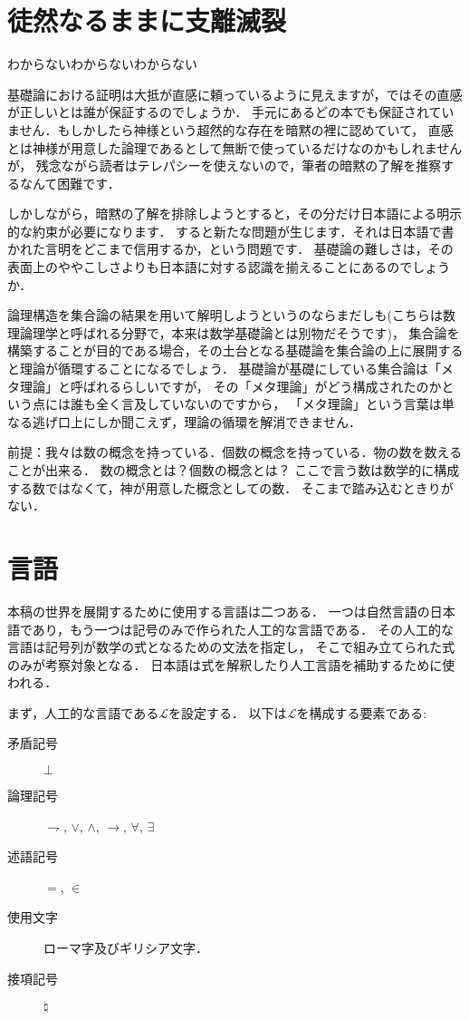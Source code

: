 \documentclass[a4j,10.5pt,oneside,openany]{jsbook}
\theoremstyle{mystyle}
\begin{document}

\section{徒然なるままに支離滅裂}
わからないわからないわからない

基礎論における証明は大抵が直感に頼っているように見えますが，ではその直感が正しいとは誰が保証するのでしょうか．
手元にあるどの本でも保証されていません．もしかしたら神様という超然的な存在を暗黙の裡に認めていて，
直感とは神様が用意した論理であるとして無断で使っているだけなのかもしれませんが，
残念ながら読者はテレパシーを使えないので，筆者の暗黙の了解を推察するなんて困難です．

しかしながら，暗黙の了解を排除しようとすると，その分だけ日本語による明示的な約束が必要になります．
すると新たな問題が生じます．それは日本語で書かれた言明をどこまで信用するか，という問題です．
基礎論の難しさは，その表面上のややこしさよりも日本語に対する認識を揃えることにあるのでしょうか．

論理構造を集合論の結果を用いて解明しようというのならまだしも(こちらは数理論理学と呼ばれる分野で，本来は数学基礎論とは別物だそうです)，
集合論を構築することが目的である場合，その土台となる基礎論を集合論の上に展開すると理論が循環することになるでしょう．
基礎論が基礎にしている集合論は「メタ理論」と呼ばれるらしいですが，
その「メタ理論」がどう構成されたのかという点には誰も全く言及していないのですから，
「メタ理論」という言葉は単なる逃げ口上にしか聞こえず，理論の循環を解消できません．

前提：我々は数の概念を持っている．個数の概念を持っている．物の数を数えることが出来る．
数の概念とは？個数の概念とは？
ここで言う数は数学的に構成する数ではなくて，神が用意した概念としての数．
そこまで踏み込むときりがない．

\section{言語}
	本稿の世界を展開するために使用する言語は二つある．
	一つは自然言語の日本語であり，もう一つは記号のみで作られた人工的な言語である．
	その人工的な言語は記号列が数学の式となるための文法を指定し，
	そこで組み立てられた式のみが考察対象となる．
	日本語は式を解釈したり人工言語を補助するために使われる．
	
	まず，人工的な言語である$\mathcal{L}$を設定する．
	以下は$\mathcal{L}$を構成する要素である:
	\begin{description}
		\item[矛盾記号] $\bot$
		\item[論理記号] $\rightharpoondown$, $\vee$, $\wedge$, $\rightarrow$, $\forall$, $\exists$
		\item[述語記号] $=$, $\in$
		\item[使用文字] ローマ字及びギリシア文字．
		\item[接項記号] $\natural$
	\end{description}
	
\end{document}
